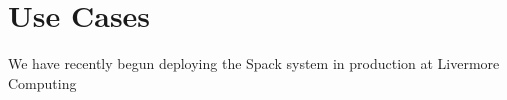 
\section{Use Cases}
\label{sec:usecases}

We have recently begun deploying the Spack system in production at
Livermore Computing




